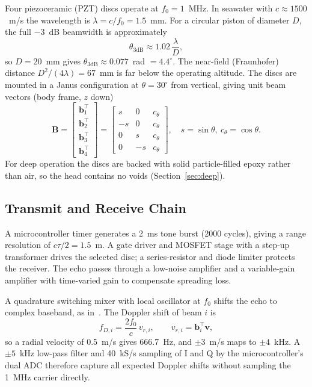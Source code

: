 \documentclass[conference]{IEEEtran}
\newcommand{\vect}[1]{\mathbf{#1}}
\begin{document}
Four piezoceramic (PZT) discs operate at $f_0=1$~MHz. In seawater with $c\approx1500$~m/s the wavelength is $\lambda=c/f_0=1.5$~mm. For a circular piston of diameter $D$, the full $-3$~dB beamwidth is approximately
\begin{equation}
\theta_{3\mathrm{dB}} \approx 1.02\,\frac{\lambda}{D},
\end{equation}
so $D=20$~mm gives $\theta_{3\mathrm{dB}}\approx0.077$~rad $=4.4^\circ$. The near-field (Fraunhofer) distance $D^2/(4\lambda)=67$~mm is far below the operating altitude. The discs are mounted in a Janus configuration at $\theta=30^\circ$ from vertical, giving unit beam vectors (body frame, $z$ down)
\begin{equation}
\vect{B}=\begin{bmatrix}\vect b_1^\top\\ \vect b_2^\top\\ \vect b_3^\top\\ \vect b_4^\top\end{bmatrix}
=\begin{bmatrix} s&0&c_\theta\\ -s&0&c_\theta\\ 0&s&c_\theta\\ 0&-s&c_\theta\end{bmatrix},\quad s=\sin\theta,\ c_\theta=\cos\theta .
\end{equation}
For deep operation the discs are backed with solid particle-filled epoxy rather than air, so the head contains no voids (Section~\ref{sec:deep}).

\subsection{Transmit and Receive Chain}

A microcontroller timer generates a 2~ms tone burst (2000 cycles), giving a range resolution of $c\tau/2=1.5$~m. A gate driver and MOSFET stage with a step-up transformer drives the selected disc; a series-resistor and diode limiter protects the receiver. The echo passes through a low-noise amplifier and a variable-gain amplifier with time-varied gain to compensate spreading loss.

A quadrature switching mixer with local oscillator at $f_0$ shifts the echo to complex baseband, as in~\cite{catsamas2022}. The Doppler shift of beam $i$ is
\begin{equation}
f_{D,i}=\frac{2f_0}{c}\,v_{r,i},\qquad v_{r,i}=\vect b_i^\top\vect v ,
\label{eq:doppler}
\end{equation}
so a radial velocity of 0.5~m/s gives 666.7~Hz, and $\pm3$~m/s maps to $\pm4$~kHz. A $\pm5$~kHz low-pass filter and 40~kS/s sampling of I and Q by the microcontroller's dual ADC therefore capture all expected Doppler shifts without sampling the 1~MHz carrier directly.
\end{document}
